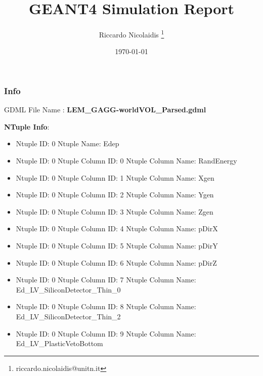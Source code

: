 \documentclass[8pt]{beamer}
\title{GEANT4 Simulation Report}
\author{Riccardo Nicolaidis \footnote{riccardo.nicolaidis@unitn.it}}
\date{\today}
\begin{document}
        
            \begin{frame}
                \titlepage
            \end{frame}
            
            \begin{frame}
                \frametitle{Info}
            
                \centering
                GDML File Name : \textbf{ LEM\_GAGG-worldVOL\_Parsed.gdml}
                
                
                \vspace{2 cm}
                \textbf{NTuple Info}:
                \vspace{1 cm}
                
        \begin{itemize}
        
        \item Ntuple ID: 0 Ntuple Name: Edep
        
        \item Ntuple ID: 0 Ntuple Column ID: 0 Ntuple Column Name: RandEnergy
        
        \item Ntuple ID: 0 Ntuple Column ID: 1 Ntuple Column Name: Xgen
        
        \item Ntuple ID: 0 Ntuple Column ID: 2 Ntuple Column Name: Ygen
        
        \item Ntuple ID: 0 Ntuple Column ID: 3 Ntuple Column Name: Zgen
        
        \item Ntuple ID: 0 Ntuple Column ID: 4 Ntuple Column Name: pDirX
        
        \item Ntuple ID: 0 Ntuple Column ID: 5 Ntuple Column Name: pDirY
        
        \item Ntuple ID: 0 Ntuple Column ID: 6 Ntuple Column Name: pDirZ
        
        \item Ntuple ID: 0 Ntuple Column ID: 7 Ntuple Column Name: Ed\_LV\_SiliconDetector\_Thin\_0
        
        \item Ntuple ID: 0 Ntuple Column ID: 8 Ntuple Column Name: Ed\_LV\_SiliconDetector\_Thin\_2
        
        \item Ntuple ID: 0 Ntuple Column ID: 9 Ntuple Column Name: Ed\_LV\_PlasticVetoBottom
        

\end{itemize}
\end{frame}
\end{document}

